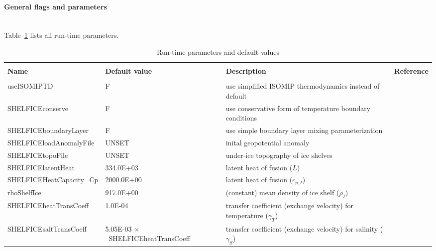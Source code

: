 \paragraph{General flags and parameters}
~ \\
%
Table~\ref{tab:pkg:shelfice:runtimeparms} lists all run-time parameters.
\begin{table}[!ht]
  \caption{Run-time parameters and default values
    \label{tab:pkg:shelfice:runtimeparms}}
  {\footnotesize
    \begin{tabular}{|lp{4cm}p{4cm}c|}
      \hline
      & & & \\
      \textbf{Name}  &  \textbf{Default value}  
      &  \textbf{Description}   &  \textbf{Reference}  \\
      & & & \\
      \hline \hline
      useISOMIPTD              & F
      &   use simplified ISOMIP thermodynamics instead of default
      &  %
      \\
      SHELFICEconserve         & F
      &   use conservative form of temperature boundary conditions
      &  %
      \\
      SHELFICEboundaryLayer    & F
      &   use simple boundary layer mixing parameterization
      &  %
      \\
      SHELFICEloadAnomalyFile  & UNSET
      &   inital geopotential anomaly
      &  %
      \\
      SHELFICEtopoFile         & UNSET
      &   under-ice topography of ice shelves
      &  %
      \\
      SHELFICElatentHeat       &  334.0E+03
      &   latent heat of fusion ($L$)
      &  %
      \\
      SHELFICEHeatCapacity\_Cp & 2000.0E+00
      &   latent heat of fusion ($c_{p,I}$)
      &  %
      \\
      rhoShelfIce              &  917.0E+00
      &   (constant) mean density of ice shelf ($\rho_{I}$)
      &  %
      \\
      SHELFICEheatTransCoeff   &    1.0E-04
      &   transfer coefficient (exchange velocity) for temperature
      ($\gamma_T$)
      &  %
      \\
      SHELFICEsaltTransCoeff   &   5.05E-03 $\times$~SHELFICEheatTransCoeff
      &   transfer coefficient (exchange velocity) for salinity
      ($\gamma_S$)
      &  %
      \\

\end{tabular}}
\end{table}
